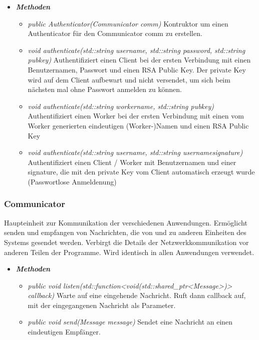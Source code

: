 \documentclass[a4paper,12pt]{article}
\begin{document}
\begin{itemize}[label={}]

	\item \textit{\textbf{Methoden}}
		\begin{itemize}[label={\textbullet}]
			\item\textit{public Authenticator(Communicator comm)} Kontruktor um einen Authenticator für den Communicator comm zu erstellen.
			\item \textit{void authenticate(std::string username, std::string password, std::string pubkey)} Authentifiziert einen Client bei der ersten Verbindung mit einen Benutzernamen, Passwort und einen RSA Public Key. Der private Key wird auf dem Client aufbewart und nicht versendet, um sich beim nächsten mal ohne Passwort anmelden zu können.
			\item \textit{void authenticate(std::string workername, std::string pubkey)} Authentifiziert einen Worker bei der ersten Verbindung mit einen vom Worker generierten eindeutigen (Worker-)Namen und einen RSA Public Key
			\item \textit{void authenticate(std::string username, std::string usernamesignature)} Authentifiziert einen Client / Worker mit Benutzernamen und einer signature, die mit den private Key vom Client automatisch erzeugt wurde (Passwortlose Anmeldenung)
		\end{itemize}


\end{itemize}

\subsubsection{Communicator}

Haupteinheit zur Kommunikation der verschiedenen Anwendungen. Ermöglicht senden und empfangen von Nachrichten, die von und zu anderen Einheiten des Systems gesendet werden. Verbirgt die Details der Netzwerkkommunikation vor anderen Teilen der Programme. Wird identisch in allen Anwendungen verwendet.

	\begin{itemize}[label={}]

	\item\textit{\textbf{Methoden}}
		\begin{itemize}[label={\textbullet}]
			\item\textit{public void listen(std::function<void(std::shared\_ptr<Message>)> callback)} Warte auf eine eingehende Nachricht. Ruft dann callback auf, mit der eingegangenen Nachricht als Parameter.
			\item\textit{public void send(Message message)} Sendet eine Nachricht an einen eindeutigen Empfänger.

		\end{itemize}

\end{itemize}
\end{document}
